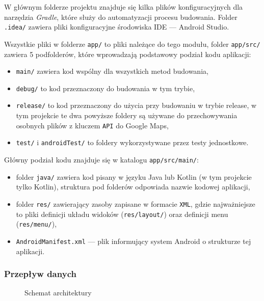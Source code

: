 \documentclass[polish,polish,a4paper,12pt]{article}
\begin{document}
		W głównym folderze projektu znajduje się kilka plików konfiguracyjnych dla narzędzia \textit{Gradle}, które służy do automatyzacji procesu budowania. Folder \texttt{.idea/} zawiera pliki konfiguracyjne środowiska IDE — Android Studio.

		Wszystkie pliki w folderze \texttt{app/} to pliki należące do tego modułu, folder \texttt{app/src/} zawiera 5 podfolderów, które wprowadzają podstawowy podział kodu aplikacji:

		\begin{itemize}
			\item \texttt{main/} zawiera kod wspólny dla wszystkich metod budowania,
			\item \texttt{debug/} to kod przeznaczony do budowania w tym trybie,
			\item \texttt{release/} to kod przeznaczony do użycia przy budowaniu w trybie release, w tym projekcie te dwa powyższe foldery są używane do przechowywania osobnych plików z kluczem \texttt{API} do Google Maps,
			\item \texttt{test/} i \texttt{androidTest/} to foldery wykorzystywane przez testy jednostkowe.
		\end{itemize}

		Główny podział kodu znajduje się w katalogu \texttt{app/src/main/}:

		\begin{itemize}
			\item folder \texttt{java/} zawiera kod pisany w języku Java lub Kotlin (w tym projekcie tylko Kotlin), struktura pod folderów odpowiada nazwie kodowej aplikacji,
			\item folder \texttt{res/} zawierający zasoby zapisane w formacie \texttt{XML}, gdzie najważniejsze to pliki definicji układu widoków (\texttt{res/layout/}) oraz definicji menu (\texttt{res/menu/}),
			\item \texttt{AndroidManifest.xml} — plik informujący system Android o strukturze tej aplikacji.
		\end{itemize}

		\subsubsection{Przepływ danych}

		\begin{figure}[H]
			\centering
			
			\caption{Schemat architektury}
			\label{fig:architecture}
		\end{figure}
\end{document}
